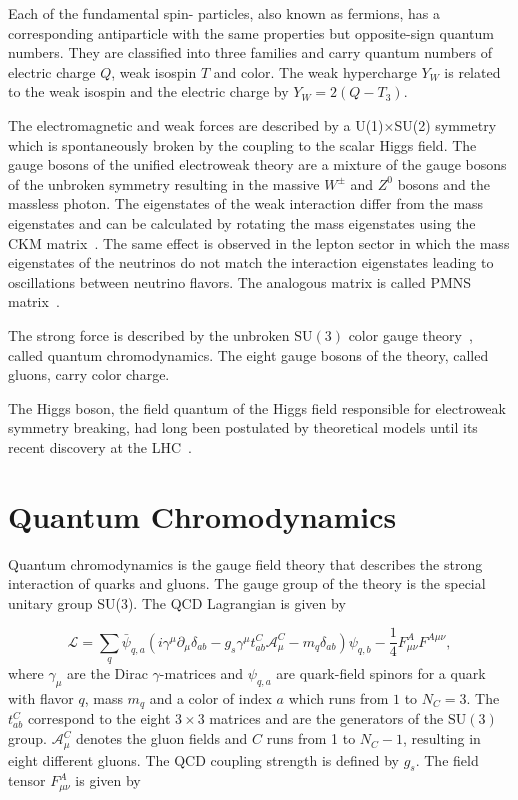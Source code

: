 Each of the fundamental spin- particles, also known as fermions, has
a corresponding antiparticle with the same properties but opposite-sign quantum
numbers. They are classified into three families and carry quantum numbers of
electric charge $Q$, weak isospin $T$ and color. The weak hypercharge $Y_W$ is
related to the weak isospin and the electric charge by $Y_W = 2(Q-T_3)$.

The electromagnetic and weak forces are described by a U(1)$\times$SU(2)
symmetry which is spontaneously broken by the coupling to the scalar Higgs
field. The gauge bosons of the unified electroweak theory are a mixture of the
gauge bosons of the unbroken symmetry resulting in the massive $W^\pm$ and $Z^0$
bosons and the massless photon. The eigenstates of the weak interaction differ
from the mass eigenstates and can be calculated by rotating the mass eigenstates
using the CKM matrix~\cite{Cabibbo:1963yz,Kobayashi:1973fv}. The same effect is
observed in the lepton sector in which the mass eigenstates of the neutrinos do
not match the interaction eigenstates leading to oscillations between neutrino
flavors.  The analogous matrix is called PMNS
matrix~\cite{Maki:1962mu,Pontecorvo:1957qd}.

The strong force is described by the unbroken $\mathrm{SU}(3)$ color gauge
theory~\cite{Zweig:1981pd,Fritzsch:1973pi}, called quantum chromodynamics. The
eight gauge bosons of the theory, called gluons, carry color charge. 

The Higgs boson, the field quantum of the Higgs field responsible for
electroweak symmetry breaking, had long been postulated by theoretical models
until its recent discovery at the LHC~\cite{Chatrchyan:2012xdj,Aad:2012tfa}.

\section{Quantum Chromodynamics}

Quantum chromodynamics is the gauge field theory that describes the
strong interaction of quarks and gluons. The gauge group of the theory is the
special unitary group SU(3). The QCD Lagrangian is given by

\begin{equation*}
   \mathcal{L} = \sum_q \bar \psi_{q,a} \left( i \gamma^\mu \partial_\mu
   \delta_{ab} - g_s \gamma^\mu t_{ab}^C \mathcal{A}_{\mu}^C - m_q \delta_{ab}
   \right) \psi_{q,b} - \frac{1}{4} F_{\mu\nu}^{A} F^{A \mu\nu},
\end{equation*}
%
where $\gamma_\mu$ are the Dirac $\gamma$-matrices and $\psi_{q,a}$ are quark-field
spinors for a quark with flavor $q$, mass $m_q$ and a color of index $a$
which runs from $1$ to $N_C=3$. The $t_{ab}^C$ correspond to the eight
$3\times3$ matrices and are the generators of the $\mathrm{SU}(3)$
group. $\mathcal{A}_\mu^C$ denotes the gluon fields and $C$ runs from 1 to
$N_C-1$, resulting in eight different gluons. The QCD coupling strength is defined
by $g_s$. The field tensor $F_{\mu\nu}^A$ is given by

